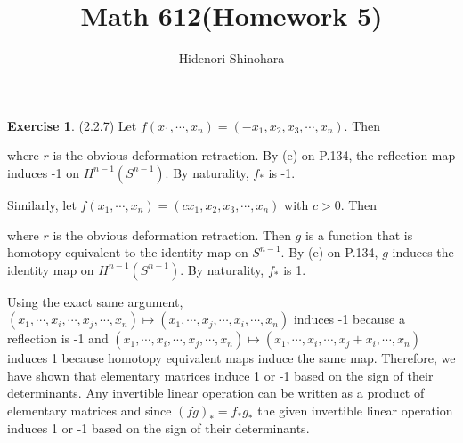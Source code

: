 \documentclass[12pt, psamsfonts]{amsart}
\theoremstyle{definition}
\newtheorem*{exer}{Exercise}
\theoremstyle{remark}
\numberwithin{equation}{section}
\begin{document}
\title{Math 612(Homework 5)}
\author{Hidenori Shinohara}
\maketitle

\begin{exer}{(2.2.7)}
  Let $f(x_1, \cdots, x_n) = (-x_1, x_2, x_3, \cdots, x_n)$.
  Then
  \begin{center}
  \end{center}
  where $r$ is the obvious deformation retraction.
  By (e) on P.134, the reflection map induces -1 on $H^{n - 1}(S^{n - 1})$.
  By naturality, $f_{\ast}$ is -1.

  Similarly, let $f(x_1, \cdots, x_n) = (cx_1, x_2, x_3, \cdots, x_n)$ with $c > 0$.
  Then
  \begin{center}
  \end{center}
  where $r$ is the obvious deformation retraction.
  Then $g$ is a function that is homotopy equivalent to the identity map on $S^{n - 1}$.
  By (e) on P.134, $g$ induces the identity map on $H^{n - 1}(S^{n - 1})$.
  By naturality, $f_{\ast}$ is 1.

  Using the exact same argument, $(x_1, \cdots, x_i, \cdots, x_j, \cdots, x_n) \mapsto (x_1, \cdots, x_j, \cdots, x_i, \cdots, x_n)$ induces -1 because a reflection is -1 and $(x_1, \cdots, x_i, \cdots, x_j, \cdots, x_n) \mapsto (x_1, \cdots, x_i, \cdots, x_j + x_i, \cdots, x_n)$ induces 1 because homotopy equivalent maps induce the same map.
  Therefore, we have shown that elementary matrices induce 1 or -1 based on the sign of their determinants.
  Any invertible linear operation can be written as a product of elementary matrices and since $(fg)_{\ast} = f_{\ast}g_{\ast}$ the given invertible linear operation induces 1 or -1 based on the sign of their determinants.
\end{exer}
\end{document}
